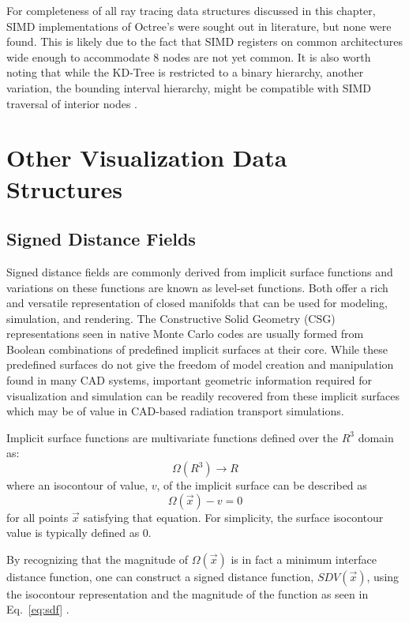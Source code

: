For completeness of all ray tracing data structures discussed in this chapter,
SIMD implementations of Octree's were sought out in literature, but none were
found. This is likely due to the fact that SIMD registers on common
architectures wide enough to accommodate 8 nodes are not yet common. It is also
worth noting that while the KD-Tree is restricted to a binary hierarchy, another
variation, the bounding interval hierarchy, might be compatible with SIMD
traversal of interior nodes \cite{Watcher_2006}.

\section{Other Visualization Data Structures}

\subsection{Signed Distance Fields}

Signed distance fields are commonly derived from implicit surface functions and
variations on these functions are known as level-set functions. Both offer a rich
and versatile representation of closed manifolds that can be used for modeling,
simulation, and rendering. The Constructive Solid Geometry (CSG) representations
seen in native Monte Carlo codes are usually formed from Boolean combinations of
predefined implicit surfaces at their core. While these predefined surfaces do
not give the freedom of model creation and manipulation found in many CAD
systems, important geometric information required for visualization and
simulation can be readily recovered from these implicit surfaces which may be of
value in CAD-based radiation transport simulations.

Implicit surface functions are multivariate functions defined over the
$R^3$ domain as:
\begin{equation} \label{eq:implicit_surf_rep}
      \Omega(R^3)\rightarrow R
\end{equation}
where an isocontour of value, $v$, of the implicit surface can be
described as
\begin{equation} \label{eq:implicit_surf_isocontour}
  \Omega(\vec{x}) - v  = 0 
\end{equation}
for all points $\vec{x}$ satisfying that equation. For simplicity, the surface
isocontour value is typically defined as $0$. 

By recognizing that the magnitude of $\Omega(\vec{x})$ is in fact a
minimum interface distance function, one can construct a signed
distance function, $SDV(\vec{x})$, using the isocontour representation
and the magnitude of the function as seen in Eq.~\ref{eq:sdf}
\cite{Osher_2003}.

